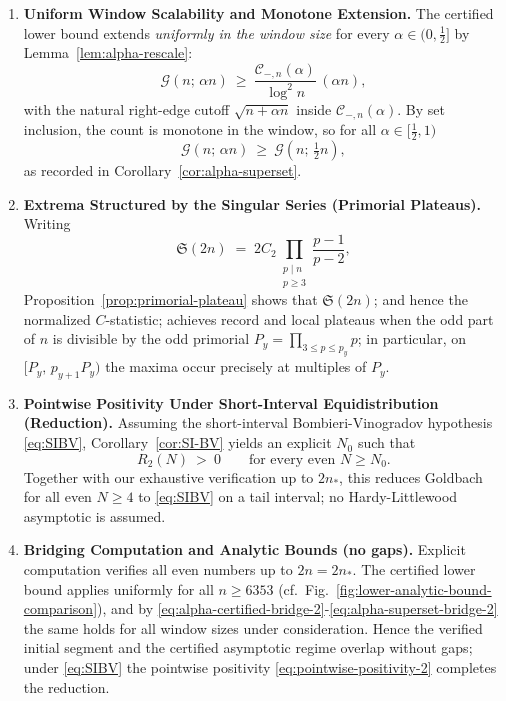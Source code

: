 \documentclass[11pt]{article}
\theoremstyle{inline}
\theoremstyle{break}
\theoremstyle{break}
\theoremstyle{break}
\theoremstyle{break}
\theoremstyle{break}
\theoremstyle{break}
\theoremstyle{break}
\theoremstyle{inline}
\newcommand{\xMertens}{6353} %
\newcommand{\CminusProductAlpha}[2]{\mathcal{C}_{-,#2}\!\left(#1\right)}
\newcommand{\nprodstar}{n_{\ast}}  %
\begin{document}
\begin{enumerate}
  \item \textbf{Uniform Window Scalability and Monotone Extension.}
  The certified lower bound extends \emph{uniformly in the window size} for every \( \alpha\in(0,\tfrac12] \) by Lemma~\ref{lem:alpha-rescale}:
  \begin{equation}\label{eq:alpha-certified-bridge-2}
    \mathcal{G}(n;\,\alpha n)\ \ge\ \frac{\CminusProductAlpha{\alpha}{n}}{\log^2 n}\,(\alpha n),
  \end{equation}
  with the natural right-edge cutoff \( \sqrt{n+\alpha n} \) inside \( \CminusProductAlpha{\alpha}{n} \).
  By set inclusion, the count is monotone in the window, so for all \( \alpha\in[\tfrac12,1) \)
  \begin{equation}\label{eq:alpha-superset-bridge-2}
    \mathcal{G}(n;\,\alpha n)\ \ge\ \mathcal{G}\!\left(n;\,\tfrac12 n\right),
  \end{equation}
  as recorded in Corollary~\ref{cor:alpha-superset}.

  \item \textbf{Extrema Structured by the Singular Series (Primorial Plateaus).}
  Writing
  \begin{equation}\label{eq:sing-series-bridge-2}
    \mathfrak S(2n)\;=\;2C_2\prod_{\substack{p\mid n\\ p\ge 3}}\frac{p-1}{p-2},
  \end{equation}
  Proposition~\ref{prop:primorial-plateau} shows that \( \mathfrak S(2n) \); and hence the normalized \( C \)-statistic; achieves record and local plateaus when the odd part of \(n\) is divisible by the odd primorial \( P_y=\prod_{3\le p\le p_y}p \); in particular, on \( [P_y,\,p_{y+1}P_y) \) the maxima occur precisely at multiples of \( P_y \).

  \item \textbf{Pointwise Positivity Under Short-Interval Equidistribution (Reduction).}
  Assuming the short-interval Bombieri-Vinogradov hypothesis \eqref{eq:SIBV}, Corollary~\ref{cor:SI-BV} yields an explicit \( N_0 \) such that
  \begin{equation}\label{eq:pointwise-positivity-2}
    R_2(N)\ >\ 0\qquad\text{for every even }N\ge N_0.
  \end{equation}
  Together with our exhaustive verification up to \( 2\nprodstar \), this reduces Goldbach for all even \( N\ge 4 \) to \eqref{eq:SIBV} on a tail interval; no Hardy-Littlewood asymptotic is assumed.

  \item \textbf{Bridging Computation and Analytic Bounds (no gaps).}
  Explicit computation verifies all even numbers up to \(2n=2\nprodstar\).  The certified lower bound applies uniformly for all \( n\ge \xMertens \) (cf.\ Fig.~\ref{fig:lower-analytic-bound-comparison}), and by \eqref{eq:alpha-certified-bridge-2}-\eqref{eq:alpha-superset-bridge-2} the same holds for all window sizes under consideration. Hence the verified initial segment and the certified asymptotic regime overlap without gaps; under \eqref{eq:SIBV} the pointwise positivity \eqref{eq:pointwise-positivity-2} completes the reduction.
\end{enumerate}
\end{document}
